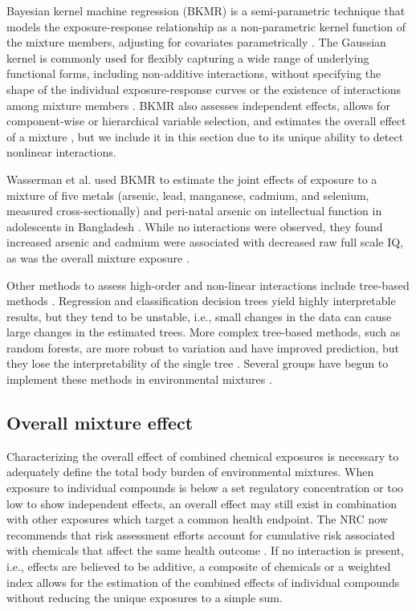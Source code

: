 Bayesian kernel machine regression (BKMR) is a semi-parametric technique that models the exposure-response relationship as a non-parametric kernel function of the mixture members, adjusting for covariates parametrically \cite{bobb2014bayesian, coull2015,bobb2018statistical}. The Gaussian kernel is commonly used for flexibly capturing a wide range of underlying functional forms, including non-additive interactions, without specifying the shape of the individual exposure-response curves or the existence of interactions among mixture members \cite{bobb2014bayesian, liu2007semiparametric}. BKMR also assesses independent effects, allows for component-wise or hierarchical variable selection, and estimates the overall effect of a mixture \cite{bobb2014bayesian, coull2015, bobb2018statistical}, but we include it in this section due to its unique ability to detect nonlinear interactions.

Wasserman et al. used BKMR to estimate the joint effects of exposure to a mixture of five metals (arsenic, lead, manganese, cadmium, and selenium, measured cross-sectionally) and peri-natal arsenic on intellectual function in adolescents in Bangladesh \cite{wasserman2018cross}. While no interactions were observed, they found increased arsenic and cadmium were associated with decreased raw full scale IQ, as was the overall mixture exposure \cite{wasserman2018cross}.

Other methods to assess high-order and non-linear interactions include tree-based methods \cite{friedman2001elements}. Regression and classification decision trees yield highly interpretable results, but they tend to be unstable, i.e., small changes in the data can cause large changes in the estimated trees. More complex tree-based methods, such as random forests, are more robust to variation and have improved prediction, but they lose the interpretability of the single tree \cite{ISLR}. Several groups have begun to implement these methods in environmental mixtures \cite{stingone2017using, ouidir2017atmospheric, gass2014classification}.

\subsection{Overall mixture effect}\label{sec:Overall}

Characterizing the overall effect of combined chemical exposures is necessary to adequately define the total body burden of environmental mixtures. When exposure to individual compounds is below a set regulatory concentration or too low to show independent effects, an overall effect may still exist in combination with other exposures which target a common health endpoint. The NRC now recommends that risk assessment efforts account for cumulative risk associated with chemicals that affect the same health outcome \cite{national2009phthalates, huang2018cumulative}. If no interaction is present, i.e., effects are believed to be additive, a composite of chemicals or a weighted index allows for the estimation of the combined effects of individual compounds without reducing the unique exposures to a simple sum. 

